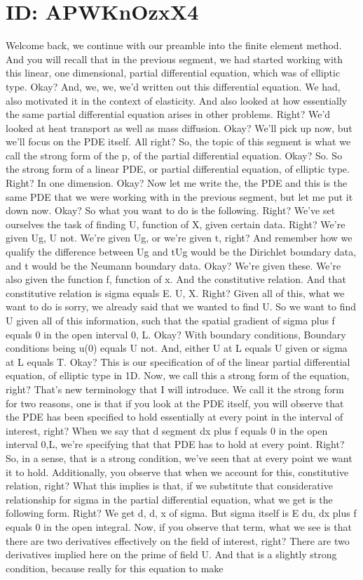\documentclass[10pt]{article}
\begin{document}
\section*{ID: APWKnOzxX4}
Welcome back, we continue with our preamble into the finite element method. And you will recall that in the previous segment, we had started working with this linear, one dimensional, partial differential equation, which was of elliptic type. Okay? And, we, we, we'd written out this differential equation. We had, also motivated it in the context of elasticity. And also looked at how essentially the same partial differential equation arises in other problems. Right? We'd looked at heat transport as well as mass diffusion. Okay? We'll pick up now, but we'll focus on the PDE itself. All right? So, the topic of this segment is what we call the strong form of the p, of the partial differential equation. Okay? So. So the strong form of a linear PDE, or partial differential equation, of elliptic type. Right? In one dimension. Okay? Now let me write the, the PDE and this is the same PDE that we were working with in the previous segment, but let me put it down now. Okay? So what you want to do is the following. Right? We've set ourselves the task of finding U, function of X, given certain data. Right? We're given Ug, U not. We're given Ug, or we're given t, right? And remember how we qualify the difference between Ug and tUg would be the Dirichlet boundary data, and t would be the Neumann boundary data. Okay? We're given these. We're also given the function f, function of x. And the constitutive relation. And that constitutive relation is sigma equals E. U, X. Right? Given all of this, what we want to do is sorry, we already said that we wanted to find U. So we want to find U given all of this information, such that the spatial gradient of sigma plus f equals 0 in the open interval 0, L. Okay? With boundary conditions, Boundary conditions being u(0) equals U not. And, either U at L equals U given or sigma at L equals T. Okay? This is our specification of of the linear partial differential equation, of elliptic type in 1D. Now, we call this a strong form of the equation, right? That's new terminology that I will introduce. We call it the strong form for two reasons, one is that if you look at the PDE itself, you will observe that the PDE has been specified to hold essentially at every point in the interval of interest, right? When we say that d segment dx plus f equals 0 in the open interval 0,L, we're specifying that that PDE has to hold at every point. Right? So, in a sense, that is a strong condition, we've seen that at every point we want it to hold. Additionally, you observe that when we account for this, constitutive relation, right? What this implies is that, if we substitute that considerative relationship for sigma in the partial differential equation, what we get is the following form. Right? We get d, d, x of sigma. But sigma itself is E du, dx plus f equals 0 in the open integral. Now, if you observe that term, what we see is that there are two derivatives effectively on the field of interest, right? There are two derivatives implied here on the prime of field U. And that is a slightly strong condition, because really for this equation to make 
\end{document}
